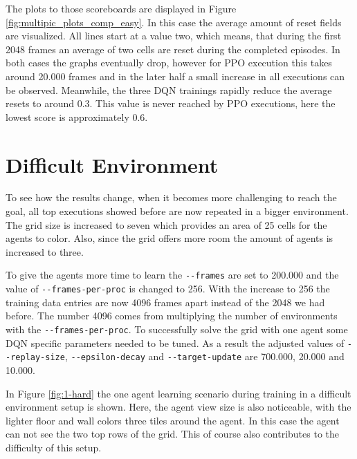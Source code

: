 The plots to those scoreboards are displayed in Figure \ref{fig:multipic_plots_comp_easy}. In this case the average amount of reset fields are visualized. All lines start at a value two, which means, that during the first 2048 frames an average of two cells are reset during the completed episodes. In both cases the graphs eventually drop, however for PPO execution this takes around 20.000 frames and in the later half a small increase in all executions can be observed. Meanwhile, the three DQN trainings rapidly reduce the average resets to around 0.3. This value is never reached by PPO executions, here the lowest score is approximately 0.6.

\section{Difficult Environment} \label{difficult_env}
To see how the results change, when it becomes more challenging to reach the goal, all top executions showed before are now repeated in a bigger environment. The grid size is increased to seven which provides an area of 25 cells for the agents to color. Also, since the grid offers more room the amount of agents is increased to three.

To give the agents more time to learn the \verb|--frames| are set to 200.000 and the value of \verb|--frames-per-proc| is changed to 256. With the increase to 256 the training data entries are now 4096 frames apart instead of the 2048 we had before. The number 4096 comes from multiplying the number of environments with the \verb|--frames-per-proc|. To successfully solve the grid with one agent some DQN specific parameters needed to be tuned. As a result the adjusted values of \verb|--replay-size|, \verb|--epsilon-decay| and \verb|--target-update| are 700.000, 20.000 and 10.000. 

In Figure \ref{fig:1-hard} the one agent learning scenario during training in a difficult environment setup is shown. Here, the agent view size is also noticeable, with the lighter floor and wall colors three tiles around the agent. In this case the agent can not see the two top rows of the grid. This of course also contributes to the difficulty of this setup. \\

